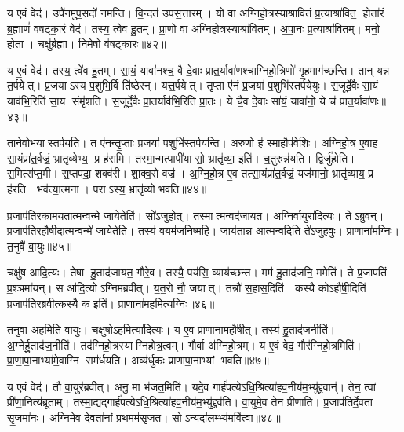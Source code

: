 य ए॒वं वेद॑। उपै॑नमुप॒सदो॑ नमन्ति। वि॒न्दत॑ उपस॒त्तारम्। यो वा अ॑ग्निहो॒त्रस्याश्रा॑वितं प्र॒त्याश्रा॑वित॒ होता॑रं ब्र॒ह्माणं॑ वषट्का॒रं वेद॑। तस्य॒ त्वे॑व हु॒तम्। प्रा॒णो वा अ॑ग्निहो॒त्रस्याश्रा॑वितम्। अ॒पा॒नः प्र॒त्याश्रा॑वितम्। मनो॒ होता। चक्षु॑र्ब्र॒ह्मा। नि॒मे॒षो व॑षट्का॒रः॥४२॥

य ए॒वं वेद॑। तस्य॒ त्वे॑व हु॒तम्। सा॒यं॒ यावा॑नश्च॒ वै दे॒वाः प्रा॑त॒र्यावा॑णश्चाग्निहो॒त्रिणो॑ गृ॒हमाग॑च्छन्ति। तान् यन्न त॒र्पयेत्। प्र॒जयाऽस्य प॒शुभि॒र्वि ति॑ष्ठेरन्। यत्त॒र्पयेत्। तृ॒प्ता ए॑नं प्र॒जया॑ प॒शुभि॑स्तर्पयेयुः। स॒जूर्दे॒वैः सा॒यं याव॑भि॒रिति॑ सा॒य संमृ॑शति। स॒जूर्दे॒वैः प्रा॒तर्याव॑भि॒रिति॑ प्रा॒तः। ये चै॒व दे॒वाः सा॑यं॒ यावा॑नो॒ ये च॑ प्रात॒र्यावा॑णः॥४३॥

ताने॒वोभयास्तर्पयति। त ए॑नन्तृ॒प्ताः प्र॒जया॑ प॒शुभि॑स्तर्पयन्ति। अ॒रु॒णो ह॑ स्मा॒हौप॑वेशिः। अ॒ग्नि॒हो॒त्र ए॒वाह सा॒यंप्रा॑त॒र्वज्रं॒ भ्रातृ॑व्येभ्य॒ प्र ह॑रामि। तस्मा॒न्मत्पापी॑यासो॒ भ्रातृ॑व्या॒ इति॑। च॒तुरुन्न॑यति। द्विर्जु॑होति। स॒मित्स॑प्त॒मी। स॒प्तप॑दा॒ शक्व॑री। शा॒क्व॒रो वज्र॑। अ॒ग्नि॒हो॒त्र ए॒व तत्सा॒यंप्रा॑त॒र्वज्रं॒ यज॑मानो॒ भ्रातृ॑व्याय॒ प्र ह॑रति। भव॑त्या॒त्मना। पराऽस्य॒ भ्रातृ॑व्यो भवति॥४४॥

प्र॒जाप॑तिरकामयतात्म॒न्वन्मे॑ जाये॒तेति॑। सो॑ऽजुहोत्। तस्मात्म॒न्वद॑जायत। अ॒ग्निर्वा॒युरा॑दि॒त्यः। तेऽब्रुवन्। प्र॒जाप॑तिरहौषीदात्म॒न्वन्मे॑ जाये॒तेति॑। तस्य॑ व॒यम॑जनिष्महि। जाय॑तान्न आत्म॒न्वदिति॒ ते॑ऽजुहवुः। प्रा॒णाना॑म॒ग्निः। त॒नुवै॑ वा॒युः॥४५॥

चक्षु॑ष आदि॒त्यः। तेषा हु॒ताद॑जायत॒ गौरे॒व। तस्यै॒ पय॑सि॒ व्याय॑च्छन्त। मम॑ हु॒ताद॑जनि॒ ममेति॑। ते प्र॒जाप॑तिं प्र॒श्ञमा॑यन्। स आ॑दि॒त्योऽग्निम॑ब्रवीत्। य॒त॒रो नौ॒ जयात्। तन्नौ॑ स॒हास॒दिति॑। कस्यै कोऽहौ॑षी॒दिति॑ प्र॒जाप॑तिरब्रवी॒त्कस्यै क॒ इति॑। प्रा॒णाना॑म॒हमित्य॒ग्निः॥४६॥

त॒नुवा॑ अ॒हमिति॑ वा॒युः। चक्षु॑षो॒ऽहमित्या॑दि॒त्यः। य ए॒व प्रा॒णाना॒महौ॑षीत्। तस्य॑ हु॒ताद॑ज॒नीति॑। अ॒ग्नेर्\mbox{}हु॒ताद॑ज॒नीति॑। तद॑ग्निहो॒त्रस्याग्निहोत्र॒त्वम्। गौर्वा अ॑ग्निहो॒त्रम्। य ए॒वं वेद॒ गौर॑ग्निहो॒त्रमिति॑। प्रा॒णा॒पा॒नाभ्या॑मे॒वाग्नि सम॑र्धयति। अव्य॑र्धुकः प्राणापा॒नाभ्यां भवति॥४७॥

य ए॒वं वेद॑। तौ वा॒युर॑ब्रवीत्। अनु॒ मा भ॑जत॒मिति॑। यदे॒व गार्\mbox{}ह॑पत्येऽधि॒श्रित्या॑हव॒नीय॑म॒भ्यु॑द्द्रवान्॑। तेन॒ त्वां प्री॑णा॒नित्य॑ब्रूताम्। तस्मा॒द्यद्गार्\mbox{}ह॑पत्येऽधि॒श्रित्या॑हव॒नीय॑म॒भ्यु॑द्द्रव॑ति। वा॒युमे॒व तेन॑ प्रीणाति। प्र॒जाप॑तिर्दे॒वता सृ॒जमा॑नः। अ॒ग्निमे॒व दे॒वता॑नां प्रथ॒मम॑सृजत। सोऽन्यदा॑ल॒म्भ्य॑मवि॑त्वा॥४८॥

